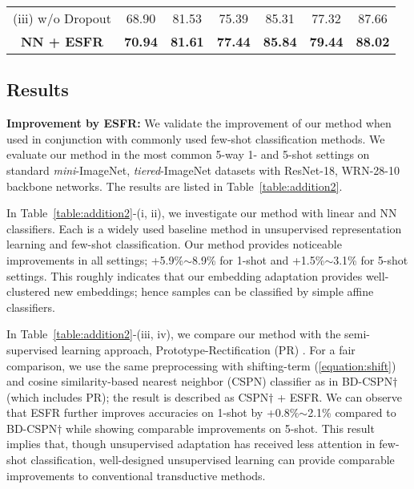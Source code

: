\documentclass{article}
\begin{document}
\begin{table*}[t]
\begin{small}
\begin{center}
\begin{tabular}{c|cc|cc|cc}
				(iii) w/o Dropout                                   & 68.90                & 81.53                & 75.39                 & 85.31                 & 77.32          & 87.66           \\
				\rowcolor[HTML]{EFEFEF} \textbf{NN + ESFR} & \textbf{70.94}       & \textbf{81.61}       & \textbf{77.44}        & \textbf{85.84}        & \textbf{79.44}  & \textbf{88.02}  \\ \hline
			\end{tabular}
		\end{center}
	\end{small}
	\vskip -0.2in
\end{table*} \subsection{Results}
\label{subsection:main_results}
\textbf{Improvement by ESFR:}
We validate the improvement of our method when used in conjunction with commonly used few-shot classification methods. We evaluate our method in the most common 5-way 1- and 5-shot settings on standard \textit{mini}-ImageNet, \textit{tiered}-ImageNet datasets with ResNet-18, WRN-28-10 backbone networks. The results are listed in Table~\ref{table:addition2}.

In Table~\ref{table:addition2}-(i, ii), we investigate our method with linear and NN classifiers. Each is a widely used baseline method in unsupervised representation learning and few-shot classification. Our method provides noticeable improvements in all settings;  +5.9\%$\sim$8.9\% for 1-shot and +1.5\%$\sim$3.1\% for 5-shot settings. This roughly indicates that our embedding adaptation provides well-clustered new embeddings; hence samples can be classified by simple affine classifiers.

In Table~\ref{table:addition2}-(iii, iv), we compare our method with the semi-supervised learning approach, Prototype-Rectification (PR) \cite{BDCSPN}. For a fair comparison, we use the same preprocessing with shifting-term (\ref{equation:shift}) and cosine similarity-based nearest neighbor (CSPN) classifier as in BD-CSPN$\dagger$ (which includes PR); the result is described as CSPN$\dagger$ + ESFR. We can observe that ESFR further improves accuracies on 1-shot by +0.8\%$\sim$2.1\% compared to BD-CSPN$\dagger$ while showing comparable improvements on 5-shot. This result implies that, though unsupervised adaptation has received less attention in few-shot classification, well-designed unsupervised learning can provide comparable improvements to conventional transductive methods.
\end{document}
